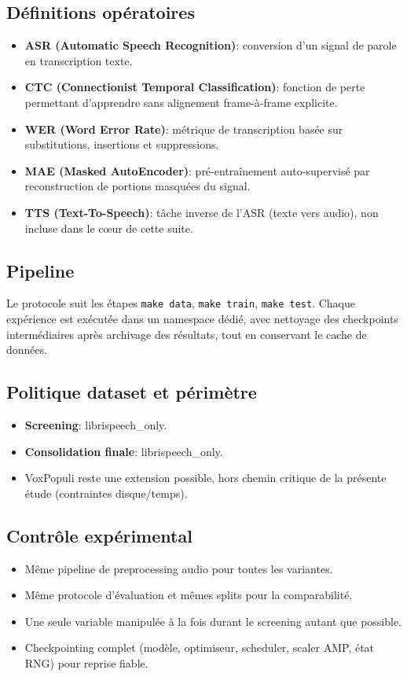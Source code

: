 \documentclass[11pt,a4paper]{article}
\begin{document}
\subsection{Définitions opératoires}
\begin{itemize}
\item \textbf{ASR (Automatic Speech Recognition)}: conversion d'un signal de parole en transcription texte.
\item \textbf{CTC (Connectionist Temporal Classification)}: fonction de perte permettant d'apprendre sans alignement frame-à-frame explicite.
\item \textbf{WER (Word Error Rate)}: métrique de transcription basée sur substitutions, insertions et suppressions.
\item \textbf{MAE (Masked AutoEncoder)}: pré-entraînement auto-supervisé par reconstruction de portions masquées du signal.
\item \textbf{TTS (Text-To-Speech)}: tâche inverse de l'ASR (texte vers audio), non incluse dans le cœur de cette suite.
\end{itemize}

\subsection{Pipeline}
Le protocole suit les étapes \texttt{make data}, \texttt{make train}, \texttt{make test}.
Chaque expérience est exécutée dans un namespace dédié, avec nettoyage des checkpoints intermédiaires après archivage des résultats, tout en conservant le cache de données.

\subsection{Politique dataset et périmètre}
\begin{itemize}
\item \textbf{Screening}: librispeech\_only.
\item \textbf{Consolidation finale}: librispeech\_only.
\item VoxPopuli reste une extension possible, hors chemin critique de la présente étude (contraintes disque/temps).
\end{itemize}

\subsection{Contrôle expérimental}
\begin{itemize}
\item Même pipeline de preprocessing audio pour toutes les variantes.
\item Même protocole d'évaluation et mêmes splits pour la comparabilité.
\item Une seule variable manipulée à la fois durant le screening autant que possible.
\item Checkpointing complet (modèle, optimiseur, scheduler, scaler AMP, état RNG) pour reprise fiable.
\end{itemize}
\end{document}
